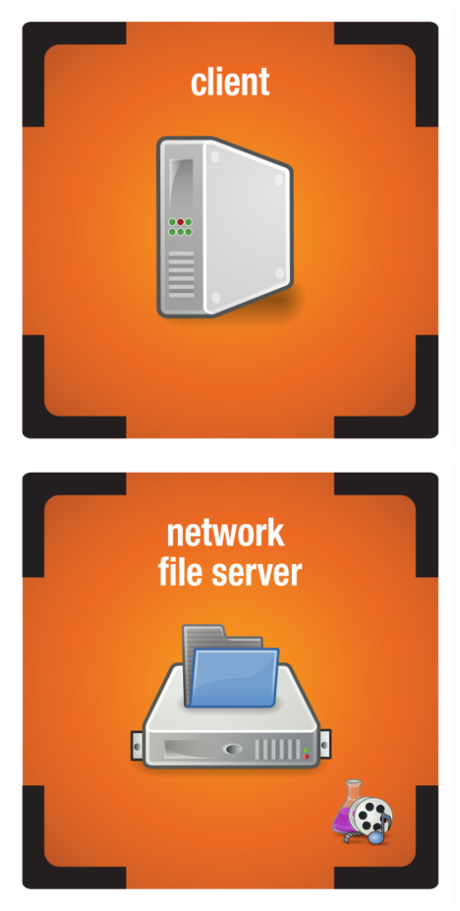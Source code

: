 \documentclass{letter}
\begin{document}
\includegraphics{tiles/node_client_tower_compromised}
\includegraphics{tiles/node_network_file_server_compromised} \\
\end{document}
